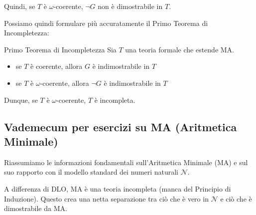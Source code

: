 \documentclass[a4paper,11pt]{report}
\begin{document}
\begin{pframe}
\begin{enumerate}
Quindi, se \( T \) è \(\omega\)-coerente, \(\neg G\) non è dimostrabile in \( T \).

    \end{enumerate}
\end{pframe}

Possiamo quindi formulare più accuratamente il Primo Teorema di Incompletezza:
\begin{thmframe}{Primo Teorema di Incompletezza}{}
    Sia \( T \) una teoria formale che estende MA.
    \begin{itemize}
        \item se \( T \) è coerente, allora \( G \) è indimostrabile in \( T \)
        \item se \( T \) è \( \omega\)-coerente, allora \( \neg G \) è indimostrabile in \( T \)
    \end{itemize}

    Dunque, se \( T \) è \( \omega\)-coerente, \( T \) è incompleta.
\end{thmframe}



\subsection*{Vademecum per esercizi su MA (Aritmetica Minimale)}
Riassumiamo le informazioni fondamentali sull'Aritmetica Minimale (MA) e sul suo rapporto con il modello standard dei numeri naturali \( \mathcal{N} \).

A differenza di DLO, MA è una teoria incompleta (manca del Principio di Induzione). Questo crea una netta separazione tra ciò che è vero in \( \mathcal{N} \) e ciò che è dimostrabile da MA. 
\end{document}
